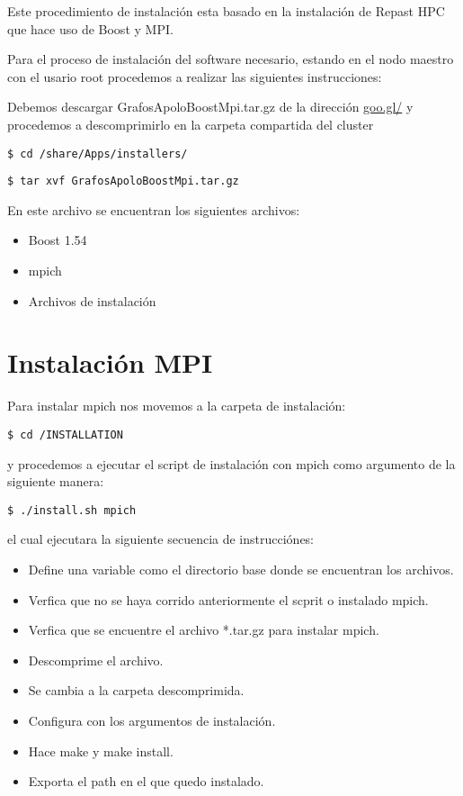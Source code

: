 Este procedimiento de instalación esta basado en la instalación de Repast HPC\cite{repast} que hace uso de Boost y MPI.

Para el proceso de instalación del software necesario, estando en el nodo maestro con el usario root procedemos a realizar las siguientes instrucciones: 


Debemos descargar GrafosApoloBoostMpi.tar.gz de la dirección \url{goo.gl/} y procedemos a descomprimirlo en la carpeta compartida del cluster

\begin{verbatim}
$ cd /share/Apps/installers/
\end{verbatim}

\begin{verbatim}
$ tar xvf GrafosApoloBoostMpi.tar.gz
\end{verbatim}

En este archivo se encuentran los siguientes archivos: 

\begin{itemize}
	\item Boost 1.54
	\item mpich 
	\item Archivos de instalación
\end{itemize}

\newpage

\section{Instalación MPI}

Para instalar mpich nos movemos a la carpeta de instalación:

\begin{verbatim}
$ cd /INSTALLATION
\end{verbatim}

y procedemos a ejecutar el script de instalación con mpich como argumento de la siguiente manera:

\begin{verbatim}
$ ./install.sh mpich
\end{verbatim}

el cual ejecutara la siguiente secuencia de instrucciónes: 

\begin{itemize}
	\item Define una variable como el directorio base donde se encuentran los archivos.
	\item Verfica que no se haya corrido anteriormente el scprit o instalado mpich.
	\item Verfica que se encuentre el archivo *.tar.gz para instalar mpich.
	\item Descomprime el archivo.
	\item Se cambia a la carpeta descomprimida.
	\item Configura con los argumentos de instalación.
	\item Hace make y make install.
	\item Exporta el path en el que quedo instalado.
\end{itemize}

